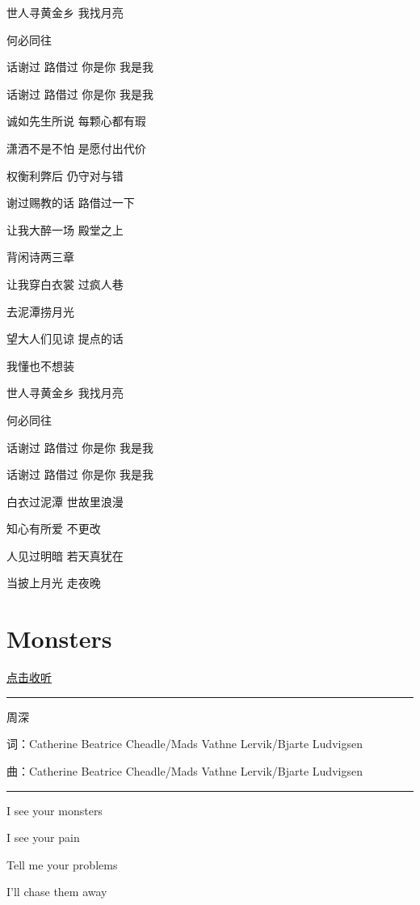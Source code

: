 \documentclass[
]{book}
\begin{document}
世人寻黄金乡 我找月亮

何必同往

话谢过 路借过 你是你 我是我

话谢过 路借过 你是你 我是我

诚如先生所说 每颗心都有瑕

潇洒不是不怕 是愿付出代价

权衡利弊后 仍守对与错

谢过赐教的话 路借过一下

让我大醉一场 殿堂之上

背闲诗两三章

让我穿白衣裳 过疯人巷

去泥潭捞月光

望大人们见谅 提点的话

我懂也不想装

世人寻黄金乡 我找月亮

何必同往

话谢过 路借过 你是你 我是我

话谢过 路借过 你是你 我是我

白衣过泥潭 世故里浪漫

知心有所爱 不更改

人见过明暗 若天真犹在

当披上月光 走夜晚

\section*{Monsters}\label{Monsters}

\href{https://y.qq.com/n/ryqq/songDetail/004IQQao12ptH0}{点击收听}

\begin{center}\rule{0.5\linewidth}{0.5pt}\end{center}

周深

词：Catherine Beatrice Cheadle/Mads Vathne Lervik/Bjarte Ludvigsen

曲：Catherine Beatrice Cheadle/Mads Vathne Lervik/Bjarte Ludvigsen

\begin{center}\rule{0.5\linewidth}{0.5pt}\end{center}

I see your monsters

I see your pain

Tell me your problems

I'll chase them away
\end{document}
